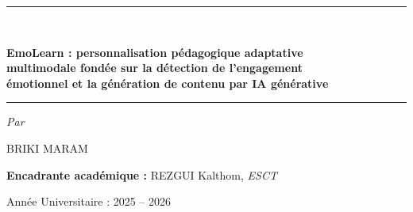 \begin{titlepage}
\vspace{1.3cm}

\rule{\textwidth}{1.5pt}\\[0.55cm]
{\large\bfseries\color{titrebleu}%
EmoLearn : personnalisation pédagogique adaptative\\[0.25cm]
multimodale fondée sur la détection de l'engagement\\[0.25cm]
émotionnel et la génération de contenu par IA générative\par}
\vspace{0.5cm}
\rule{\textwidth}{1.5pt}

\vspace{1.4cm}

{\large \textit{Par}\par}
\vspace{0.3cm}
{\Large BRIKI MARAM\par}

\vspace{1.15cm}

{\normalsize \textbf{Encadrante académique :} REZGUI Kalthom, \textit{ESCT}\par}

\vfill

{\normalsize Année Universitaire : 2025 -- 2026\par}

\restoregeometry
\end{titlepage}
